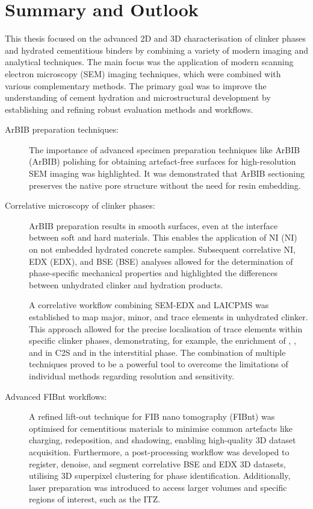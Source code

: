 \chapter{Summary and Outlook}

This thesis focused on the advanced 2D and 3D characterisation of clinker phases and hydrated cementitious binders by combining a variety of modern imaging and analytical techniques.
The main focus was the application of modern scanning electron microscopy (\ac{SEM}) imaging techniques, which were combined with various complementary methods.
The primary goal was to improve the understanding of cement hydration and microstructural development by establishing and refining robust evaluation methods and workflows.

\begin{description}

    \item[\ac{ArBIB} preparation techniques:]
    The importance of advanced specimen preparation techniques like \acl{ArBIB} (\acs{ArBIB}) polishing for obtaining artefact-free surfaces for high-resolution \ac{SEM} imaging was highlighted.
    It was demonstrated that \ac{ArBIB} sectioning preserves the native pore structure without the need for resin embedding.

    \item[Correlative microscopy of clinker phases:]
    \ac{ArBIB} preparation results in smooth surfaces, even at the interface between soft and hard materials.
    This enables the application of \acl{NI} (\acs{NI}) on not embedded hydrated concrete samples. 
    Subsequent correlative \ac{NI}, \acl{EDX} (\acs{EDX}), and \acl{BSE} (\acs{BSE}) analyses allowed for the determination of phase-specific mechanical properties and highlighted the differences between unhydrated clinker and hydration products.

    A correlative workflow combining \ac{SEM}-\ac{EDX} and \acl{LAICPMS} was established to map major, minor, and trace elements in unhydrated clinker.
    This approach allowed for the precise localisation of trace elements within specific clinker phases, demonstrating, for example, the enrichment of , , and  in \ac{C2S} and  in the interstitial phase.
    The combination of multiple techniques proved to be a powerful tool to overcome the limitations of individual methods regarding resolution and sensitivity.

    \item[Advanced \ac{FIBnt} workflows:]
    A refined lift-out technique for \acl{FIB} nano tomography (\acs{FIBnt}) was optimised for cementitious materials to minimise common artefacts like charging, redeposition, and shadowing, enabling high-quality 3D dataset acquisition.
    Furthermore, a post-processing workflow was developed to register, denoise, and segment correlative \ac{BSE} and \ac{EDX} 3D datasets, utilising 3D superpixel clustering for phase identification.
    Additionally, laser preparation was introduced to access larger volumes and specific regions of interest, such as the \acl{ITZ}.


\end{description}
